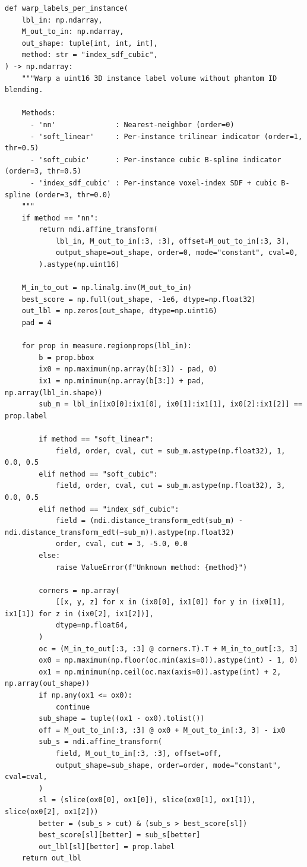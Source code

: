 \documentclass[10pt,a4paper]{article}
\renewcommand{\_}{\origunderscore\allowbreak}
\begin{document}
\begin{codebox}
\begin{lstlisting}[style=pybmed]
def warp_labels_per_instance(
    lbl_in: np.ndarray,
    M_out_to_in: np.ndarray,
    out_shape: tuple[int, int, int],
    method: str = "index_sdf_cubic",
) -> np.ndarray:
    """Warp a uint16 3D instance label volume without phantom ID blending.

    Methods:
      - 'nn'              : Nearest-neighbor (order=0)
      - 'soft_linear'     : Per-instance trilinear indicator (order=1, thr=0.5)
      - 'soft_cubic'      : Per-instance cubic B-spline indicator (order=3, thr=0.5)
      - 'index_sdf_cubic' : Per-instance voxel-index SDF + cubic B-spline (order=3, thr=0.0)
    """
    if method == "nn":
        return ndi.affine_transform(
            lbl_in, M_out_to_in[:3, :3], offset=M_out_to_in[:3, 3],
            output_shape=out_shape, order=0, mode="constant", cval=0,
        ).astype(np.uint16)

    M_in_to_out = np.linalg.inv(M_out_to_in)
    best_score = np.full(out_shape, -1e6, dtype=np.float32)
    out_lbl = np.zeros(out_shape, dtype=np.uint16)
    pad = 4

    for prop in measure.regionprops(lbl_in):
        b = prop.bbox
        ix0 = np.maximum(np.array(b[:3]) - pad, 0)
        ix1 = np.minimum(np.array(b[3:]) + pad, np.array(lbl_in.shape))
        sub_m = lbl_in[ix0[0]:ix1[0], ix0[1]:ix1[1], ix0[2]:ix1[2]] == prop.label

        if method == "soft_linear":
            field, order, cval, cut = sub_m.astype(np.float32), 1, 0.0, 0.5
        elif method == "soft_cubic":
            field, order, cval, cut = sub_m.astype(np.float32), 3, 0.0, 0.5
        elif method == "index_sdf_cubic":
            field = (ndi.distance_transform_edt(sub_m) - ndi.distance_transform_edt(~sub_m)).astype(np.float32)
            order, cval, cut = 3, -5.0, 0.0
        else:
            raise ValueError(f"Unknown method: {method}")

        corners = np.array(
            [[x, y, z] for x in (ix0[0], ix1[0]) for y in (ix0[1], ix1[1]) for z in (ix0[2], ix1[2])],
            dtype=np.float64,
        )
        oc = (M_in_to_out[:3, :3] @ corners.T).T + M_in_to_out[:3, 3]
        ox0 = np.maximum(np.floor(oc.min(axis=0)).astype(int) - 1, 0)
        ox1 = np.minimum(np.ceil(oc.max(axis=0)).astype(int) + 2, np.array(out_shape))
        if np.any(ox1 <= ox0):
            continue
        sub_shape = tuple((ox1 - ox0).tolist())
        off = M_out_to_in[:3, :3] @ ox0 + M_out_to_in[:3, 3] - ix0
        sub_s = ndi.affine_transform(
            field, M_out_to_in[:3, :3], offset=off,
            output_shape=sub_shape, order=order, mode="constant", cval=cval,
        )
        sl = (slice(ox0[0], ox1[0]), slice(ox0[1], ox1[1]), slice(ox0[2], ox1[2]))
        better = (sub_s > cut) & (sub_s > best_score[sl])
        best_score[sl][better] = sub_s[better]
        out_lbl[sl][better] = prop.label
    return out_lbl



\end{lstlisting}
\end{codebox}
\end{document}
